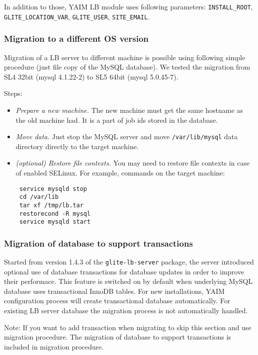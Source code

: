 In addition to those, YAIM LB module uses following parameters:
\texttt{INSTALL\_ROOT}, \texttt{GLITE\_LOCATION\_VAR}, \texttt{GLITE\_USER}, \texttt{SITE\_EMAIL}.

\subsubsection{Migration to a different OS version}
\label{inst:OSmigration}
Migration of a LB server to different machine is possible using
following simple procedure (just file copy of the MySQL database). We
tested the migration from SL4 32bit (mysql 4.1.22-2) to SL5 64bit
(mysql 5.0.45-7).

Steps:
\begin{itemize}
\item \emph{Prepare a new machine.} The new machine must get the same hostname 
 as the old machine had. It is a part of job ids stored in the database.
\item \emph{Move data.} Just stop the MySQL server and move
 \verb'/var/lib/mysql' data directory directly to the target machine.
\item \emph{(optional) Restore file contexts.} You may need to restore file 
 contexts in case of enabled SELinux. For example, commands on the target 
 machine:
 \begin{verbatim}
 service mysqld stop
 cd /var/lib
 tar xf /tmp/lb.tar
 restorecond -R mysql
 service mysqld start
 \end{verbatim}
\end{itemize}

\subsubsection{Migration of database to support transactions}
Started from version 1.4.3 of the \texttt{glite-lb-server}
package, the \LB server introduced optional use of database
transactions for \LB database updates in order to improve their
performace. This feature is switched on by default when underlying
MySQL database uses transactional InnoDB tables. For new
installations, YAIM configuration process will create transactional
database automatically. For existing LB server database the migration 
process is not automatically handled.

Note: If you want to add transaction when migrating to  skip
this section and use  migration procedure. The migration of
database to support transactions is included in  migration procedure.

